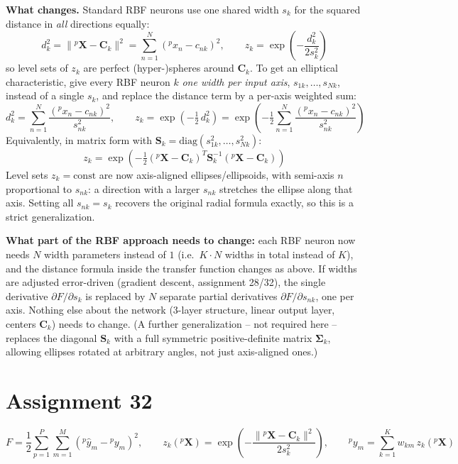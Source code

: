 \documentclass[11pt,a4paper]{article}
\begin{document}
\textbf{What changes.} Standard RBF neurons use one shared width $s_k$ for the squared distance in
\emph{all} directions equally:
\[
  d_k^2 = \|{}^p\mathbf X - \mathbf C_k\|^2 = \sum_{n=1}^N ({}^px_n-c_{nk})^2, \qquad
  z_k = \exp\!\left(-\frac{d_k^2}{2s_k^2}\right)
\]
so level sets of $z_k$ are perfect (hyper-)spheres around $\mathbf C_k$. To get an elliptical
characteristic, give every RBF neuron $k$ \emph{one width per input axis},
$s_{1k},\dots,s_{Nk}$, instead of a single $s_k$, and replace the distance term by a per-axis
weighted sum:
\[
  \boxed{d_k^2 = \sum_{n=1}^N \frac{({}^px_n-c_{nk})^2}{s_{nk}^2}}, \qquad
  z_k = \exp\!\left(-\tfrac12\, d_k^2\right) = \exp\!\left(-\tfrac12\sum_{n=1}^N \frac{({}^px_n-c_{nk})^2}{s_{nk}^2}\right)
\]
Equivalently, in matrix form with $\mathbf S_k=\mathrm{diag}(s_{1k}^2,\dots,s_{Nk}^2)$:
\[
  z_k = \exp\!\left(-\tfrac12 ({}^p\mathbf X-\mathbf C_k)^T \mathbf S_k^{-1} ({}^p\mathbf X-\mathbf C_k)\right)
\]
Level sets $z_k=\text{const}$ are now axis-aligned ellipses/ellipsoids, with semi-axis $n$
proportional to $s_{nk}$: a direction with a larger $s_{nk}$ stretches the ellipse along that axis.
Setting all $s_{nk}=s_k$ recovers the original radial formula exactly, so this is a strict
generalization.

\textbf{What part of the RBF approach needs to change:} each RBF neuron now needs $N$ width
parameters instead of $1$ (i.e.\ $K\!\cdot\!N$ widths in total instead of $K$), and the distance
formula inside the transfer function changes as above. If widths are adjusted error-driven (gradient
descent, assignment 28/32), the single derivative $\partial F/\partial s_k$ is replaced by $N$
separate partial derivatives $\partial F/\partial s_{nk}$, one per axis. Nothing else about the
network (3-layer structure, linear output layer, centers $\mathbf C_k$) needs to change. (A further
generalization -- not required here -- replaces the diagonal $\mathbf S_k$ with a full
symmetric positive-definite matrix $\boldsymbol\Sigma_k$, allowing ellipses rotated at arbitrary
angles, not just axis-aligned ones.)

\section*{Assignment 32}

\[
  F = \frac12\sum_{p=1}^P\sum_{m=1}^M\left({}^p\hat y_m-{}^py_m\right)^2, \qquad
  z_k({}^p\mathbf X) = \exp\!\left(-\frac{\|{}^p\mathbf X-\mathbf C_k\|^2}{2s_k^2}\right), \qquad
  {}^py_m = \sum_{k=1}^K w_{km}\,z_k({}^p\mathbf X)
\]
\end{document}
